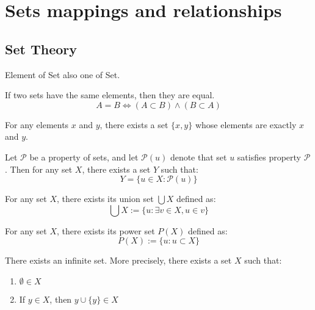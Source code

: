 
\chapter{Sets mappings and relationships}

\section{Set Theory}

\begin{remark}
  Element of Set also one of Set.
\end{remark}

\begin{axiom}
  If two sets have the same elements, then they are equal.
  \[
    A=B \iff (A \subset B) \land (B \subset A)
  \]
\end{axiom}

\begin{axiom}
  For any elements $x$ and $y$, there exists a set $\{x,y\}$ whose elements are exactly $x$ and $y$.
\end{axiom}

\begin{axiom}
  Let $\mathcal{P} $ be a property of sets, and let $\mathcal{P}(u)$ denote that set $u$ satisfies property $\mathcal{P} $. Then for any set $X$, there exists a set $Y$ such that:
  \[
    Y = \{u \in X : \mathcal{P}(u)\}
  \]
\end{axiom}

\begin{axiom}
  For any set $X$, there exists its union set $\bigcup X$ defined as:
  \[
    \bigcup X := \{u : \exists v \in X, u \in v\}
  \]
\end{axiom}

\begin{axiom}
  For any set $X$, there exists its power set $P(X)$ defined as:
  \[
    P(X) := \{u : u \subset X\}
  \]
\end{axiom}

\begin{axiom}
  There exists an infinite set. More precisely, there exists a set $X$ such that:
  \begin{enumerate}
    \item $\emptyset \in X$
    \item If $y \in X$, then $y \cup \{y\} \in X$
  \end{enumerate}
\end{axiom}

